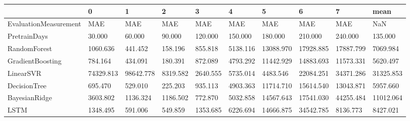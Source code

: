 \begin{tabular}{llllllllll}
\toprule
{} &         0 &         1 &        2 &        3 &        4 &         5 &         6 &         7 &      mean \\
\midrule
EvaluationMeasurement &       MAE &       MAE &      MAE &      MAE &      MAE &       MAE &       MAE &       MAE &       NaN \\
PretrainDays          &    30.000 &    60.000 &   90.000 &  120.000 &  150.000 &   180.000 &   210.000 &   240.000 &   135.000 \\
RandomForest          &  1060.636 &   441.452 &  158.196 &  855.818 & 5138.116 & 13088.970 & 17928.885 & 17887.799 &  7069.984 \\
GradientBoosting      &   784.164 &   434.091 &  180.391 &  872.089 & 4793.292 & 11442.929 & 14883.693 & 11573.331 &  5620.497 \\
LinearSVR             & 74329.813 & 98642.778 & 8319.582 & 2640.555 & 5735.014 &  4483.546 & 22084.251 & 34371.286 & 31325.853 \\
DecisionTree          &   695.470 &   529.010 &  225.203 &  935.113 & 4903.363 & 11714.710 & 15614.540 & 13043.871 &  5957.660 \\
BayesianRidge         &  3603.802 &  1136.324 & 1186.502 &  772.870 & 5032.858 & 14567.643 & 17541.030 & 44255.484 & 11012.064 \\
LSTM                  &  1348.495 &   591.006 &  549.859 & 1353.685 & 6226.694 & 14666.875 & 34542.785 &  8136.773 &  8427.021 \\
\bottomrule
\end{tabular}
